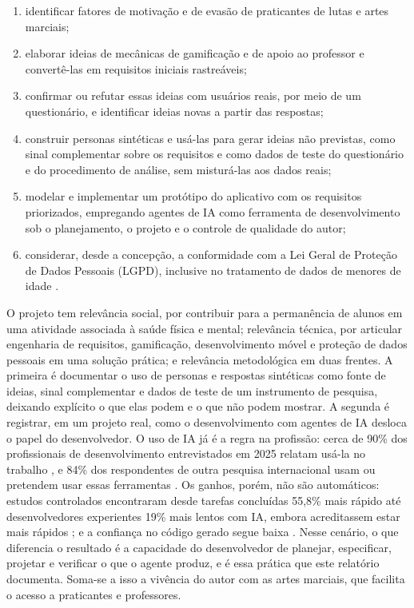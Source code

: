 \begin{enumerate}
  \item identificar fatores de motivação e de evasão de praticantes de
        lutas e artes marciais;
  \item elaborar ideias de mecânicas de gamificação e de apoio ao
        professor e convertê-las em requisitos iniciais rastreáveis;
  \item confirmar ou refutar essas ideias com usuários reais, por meio
        de um questionário, e identificar ideias novas a partir das
        respostas;
  \item construir personas sintéticas e usá-las para gerar ideias não
        previstas, como sinal complementar sobre os requisitos e como
        dados de teste do questionário e do procedimento de análise, sem
        misturá-las aos dados reais;
  \item modelar e implementar um protótipo do aplicativo com os
        requisitos priorizados, empregando agentes de IA como ferramenta
        de desenvolvimento sob o planejamento, o projeto e o controle de
        qualidade do autor;
  \item considerar, desde a concepção, a conformidade com a Lei Geral de
        Proteção de Dados Pessoais (LGPD), inclusive no tratamento de dados
        de menores de idade \cite{lgpd2018}.
\end{enumerate}

O projeto tem relevância social, por contribuir para a permanência de
alunos em uma atividade associada à saúde física e mental; relevância
técnica, por articular engenharia de requisitos, gamificação,
desenvolvimento móvel e proteção de dados pessoais em uma solução
prática; e relevância metodológica em duas frentes. A primeira é
documentar o uso de personas e respostas sintéticas como fonte de ideias,
sinal complementar e dados de teste de um instrumento de pesquisa,
deixando explícito o que elas podem e o que não podem mostrar. A segunda
é registrar, em um projeto real, como o desenvolvimento com agentes de IA
desloca o papel do desenvolvedor. O uso de IA já é a regra na profissão:
cerca de 90\% dos profissionais de desenvolvimento entrevistados em 2025
relatam usá-la no trabalho \cite{dora2025}, e 84\% dos respondentes de
outra pesquisa internacional usam ou pretendem usar essas ferramentas
\cite{stackoverflow2025}. Os ganhos, porém, não são automáticos:
estudos controlados encontraram desde tarefas concluídas 55,8\% mais
rápido \cite{peng2023} até desenvolvedores experientes 19\% mais
lentos com IA, embora acreditassem estar mais rápidos \cite{becker2025}; e
a confiança no código gerado segue baixa \cite{dora2025,stackoverflow2025}.
Nesse cenário, o que diferencia o resultado é a capacidade do
desenvolvedor de planejar, especificar, projetar e verificar o que o
agente produz, e é essa prática que este relatório documenta. Soma-se a isso a vivência do autor
com as artes marciais, que facilita o acesso a praticantes e professores.


